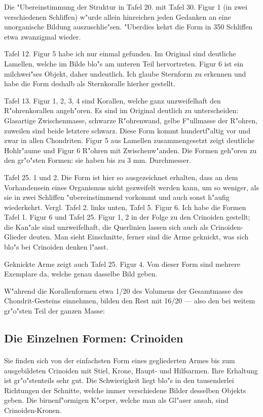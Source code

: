 \documentclass[a4paper, 11pt, oneside]{article}
\begin{document}
Die "Ubereinstimmung der Struktur in Tafel 20. mit Tafel 30. Figur 1 (in zwei verschiedenen Schliffen) w"urde allein hinreichen jeden Gedanken an eine unorganische Bildung auszuschlie"sen. "Uberdies kehrt die Form in 350 Schliffen etwa zwanzigmal wieder.

Tafel 12. Figur 5 habe ich nur einmal gefunden. Im Original sind deutliche Lamellen, welche im Bilde blo"s am unteren Teil hervortreten. Figur 6 ist ein milchwei"ses Objekt, daher undeutlich. Ich glaube Sternform zu erkennen und habe die Form deshalb als Sternkoralle hierher gestellt.

Tafel 13. Figur 1, 2, 3, 4 sind Korallen, welche ganz unzweifelhaft den R"ohrenkorallen angeh"oren. Es sind im Original deutlich zu unterscheiden: Glasartige Zwischenmasse, schwarze R"ohrenwand, gelbe F"ullmasse der R"ohren, zuweilen sind beide letztere schwarz. Diese Form kommt hundertf"altig vor und zwar in allen Chondriten. Figur 5 aus Lamellen zusammengesetzt zeigt deutliche Hohlr"aume und Figur 6 R"ohren mit Zwischenw"anden. Die Formen geh"oren zu den gr"o"sten Formen: sie haben bis zu 3 mm. Durchmesser.

Tafel 25. 1 und 2. Die Form ist hier so ausgezeichnet erhalten, dass an dem Vorhandensein eines Organismus nicht gezweifelt werden kann, um so weniger, als sie in zwei Schliffen "ubereinstimmend vorkommt und auch sonst h"aufig wiederkehrt. Vergl. Tafel 2. links unten, Tafel 5. Figur 6. Ich habe die Formen Tafel 1. Figur 6 und Tafel 25. Figur 1, 2 in der Folge zu den Crinoiden gestellt; die Kan"ale sind unzweifelhaft, die Querlinien lassen sich auch als Crinoiden-Glieder deuten. Man sieht Einschnitte, ferner sind die Arme geknickt, was sich blo"s bei Crinoiden denken l"asst.

Geknickte Arme zeigt auch Tafel 25. Figur 4. Von dieser Form sind mehrere Exemplare da, welche genau dasselbe Bild geben.

W"ahrend die Korallenformen etwa 1/20 des Volumens der Gesamtmasse des Chondrit-Gesteins einnehmen, bilden den Rest mit 16/20 --- also den bei weitem gr"o"sten Teil der ganzen Masse:
\clearpage
\subsection{Die Einzelnen Formen: Crinoiden}
\paragraph{}
Sie finden sich von der einfachsten Form eines gegliederten Armes bis zum ausgebildeten Crinoiden mit Stiel, Krone, Haupt- und Hilfsarmen. Ihre Erhaltung ist gr"o"stenteils sehr gut. Die Schwierigkeit liegt blo"s in den tausenderlei Richtungen der Schnitte, welche immer verschiedene Bilder desselben Objekts geben. Die birnenf"ormigen K"orper, welche man als Gl"aser ansah, sind Crinoiden-Kronen.
\end{document}
